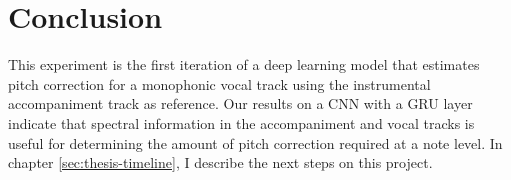 \section{Conclusion}
This experiment is the first iteration of a deep learning model that estimates pitch correction for a monophonic vocal track using the instrumental accompaniment track as reference. Our results on a CNN with a GRU layer indicate that spectral information in the accompaniment and vocal tracks is useful for determining the amount of pitch correction required at a note level. In chapter \ref{sec:thesis-timeline}, I describe the next steps on this project.

